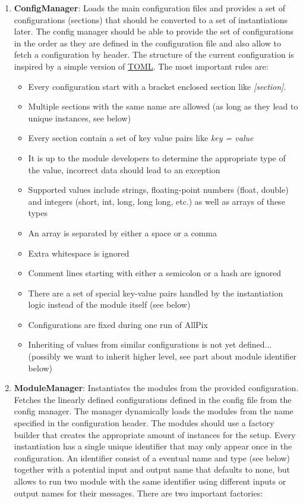 \begin{enumerate}
\item \textbf{ConfigManager}: Loads the main configuration files and provides a set of configurations (sections) that should be converted to a set of instantiations later. The config manager should be able to provide the set of configurations in the order as they are defined in the configuration file and also allow to fetch a configuration by header. The structure of the current configuration is inspired by a simple version of \href{https://github.com/toml-lang/toml}{TOML}. The most important rules are:
\begin{itemize}
\item Every configuration start with a bracket enclosed section like \textit{[section]}.
\item Multiple sections with the same name are allowed (as long as they lead to unique instances, see below)
\item Every section contain a set of key value pairs like \textit{key = value}
\item It is up to the module developers to determine the appropriate type of the value, incorrect data should lead to an exception
\item Supported values include strings, floating-point numbers (float, double) and integers (short, int, long, long long, etc.) as well as arrays of these types
\item An array is separated by either a space or a comma 
\item Extra whitespace is ignored
\item Comment lines starting with either a semicolon or a hash are ignored
\item There are a set of special key-value pairs handled by the instantiation logic instead of the module itself (see below)
\item Configurations are fixed during one run of AllPix
\item Inheriting of values from similar configurations is not yet defined... (possibly we want to inherit higher level, see part about module identifier below) 
\end{itemize}
\item \textbf{ModuleManager}: Instantiates the modules from the provided configuration. Fetches the linearly defined configurations defined in the config file from the config manager. The manager dynamically loads the modules from the name specified in the configuration header. The modules should use a factory builder that creates the appropriate amount of instances for the setup. Every instantiation has a single unique identifier that may only appear once in the configuration. An identifier consist of a eventual name and type (see below) together with a potential input and output name that defaults to none, but allows to run two module with the same identifier using different inputs or output names for their messages. There are two important factories:

\end{enumerate}
